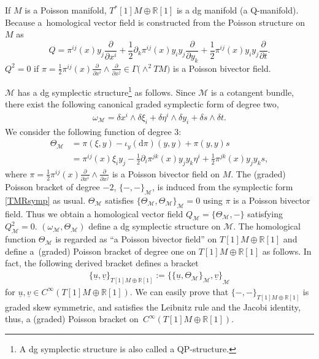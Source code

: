\documentclass[pdftex]{sigma}
\numberwithin{equation}{section}
\def\bR{{\mathbb{R}}}
\newcommand{\calM}{{\mathcal M}}
\newcommand{\sbv}[2]{{\{{{#1},{#2}}\}}}
\newcommand{\omegam}{{\omega_{\calM}}}
\newcommand{\Thetam}{{\Theta_{\calM}}}
\newcommand{\rd}{\mathrm{d}}
\newcommand{\uu}{{\underline{u}}{}}
\newcommand{\uv}{{\underline{v}}{}}
\begin{document}
If $M$ is a Poisson manifold, $T^*[1]M \oplus \bR[1]$ is a dg manifold
(a Q-manifold).
Because a~homological vector field is constructed
from the Poisson structure on $M$ as
\[%
Q =\pi^{ij}(x) y_j \frac{\partial}{\partial x^i}
+ \frac{1}{2} \partial_k \pi^{ij}(x) y_i y_j \frac{\partial}{\partial y_k}
+ \frac{1}{2} \pi^{ij}(x) y_i y_j \frac{\partial}{\partial t}.
\]
$Q^2=0$ if $\pi = \frac{1}{2} \pi^{ij}(x) \tfrac{\partial}{\partial x^i}
\wedge \tfrac{\partial}{\partial x^j} \in \Gamma\bigl(\wedge^2 TM\bigr)$
is a Poisson bivector field.

$\calM$ has a dg symplectic structure\footnote{A dg symplectic structure is also called a QP-structure.} as follows.
Since $\calM$ is a cotangent bundle, there exist the following canonical
graded symplectic form of degree two,
\begin{gather}
\omegam = \delta x^i \wedge \delta \xi_i +
\delta \eta^i \wedge \delta y_i + \delta s \wedge \delta t.
\label{TMRsymp}
\end{gather}
We consider the following function of degree $3$:
\begin{align}
\Thetam &=
\pi(\xi, y) - \iota_y (\rd \pi)(y, y) + \pi(y, y)s
\nonumber \\
&=
\pi^{ij}(x) \xi_i y_j - \frac{1}{2} \partial_i \pi^{jk}(x) y_j y_k \eta^i
+ \frac{1}{2} \pi^{jk}(x) y_j y_k s,
\label{homologicalM}
\end{align}
where
$\pi = \frac{1}{2} \pi^{ij}(x) \tfrac{\partial}{\partial x^i}
\wedge \tfrac{\partial}{\partial x^j}$
is a Poisson bivector field on $M$.
The (graded) Poisson bracket of degree $-2$,
$\sbv{-}{-}_{\calM}$, is induced from the symplectic form
\eqref{TMRsymp} as usual.
$\Thetam$ satisfies $\sbv{\Thetam}{\Thetam}_{\calM}=0$ using
$\pi$ is a Poisson bivector field.
Thus we obtain a homological vector field
$Q_{\calM} = \sbv{\Thetam}{-}$ satisfying $Q_{\calM}^2=0$.
$(\omegam, \Thetam)$ define a dg symplectic structure
on $\calM$.
The homological function $\Thetam$ is regarded as
``a Poisson bivector field'' on $T[1]M \oplus \bR[1]$
and define a~(graded) Poisson bracket of degree one
on $T[1]M \oplus \bR[1]$ as follows.
In fact, the following derived bracket defines a bracket
\begin{gather}
\sbv{\uu}{\uv}_{T[1]M \oplus \bR[1]} :=
\sbv{\sbv{\uu}{\Thetam}_{\calM}}{\uv}_{\calM}
\label{gradedPoisson01}
\end{gather}
for $\uu, \uv \in C^{\infty}(T[1]M \oplus \bR[1])$.
We can easily prove that
$\sbv{-}{-}_{T[1]M \oplus \bR[1]}$ is graded skew symmetric,
and satisfies the Leibnitz rule and the Jacobi identity, thus, a (graded) Poisson bracket on~$C^{\infty}(T[1]M \oplus \bR[1])$.
\end{document}
